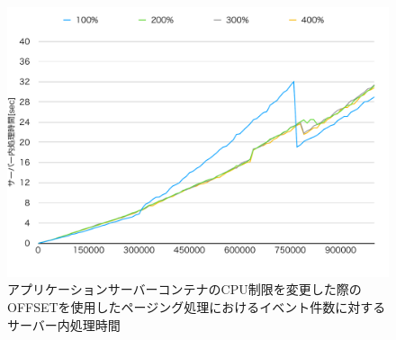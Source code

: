 \documentclass[../../../../../main]{subfiles}
\begin{document}
    \begin{figure}[H]
        \centering
        \includegraphics[width=12cm]{graph}
        \caption{アプリケーションサーバーコンテナのCPU制限を変更した際のOFFSETを使用したページング処理におけるイベント件数に対するサーバー内処理時間}
        \label{fig:paging-offset-change-app-cpu-limit-server-time-app_1024-db_1_1024}
    \end{figure}
\end{document}
